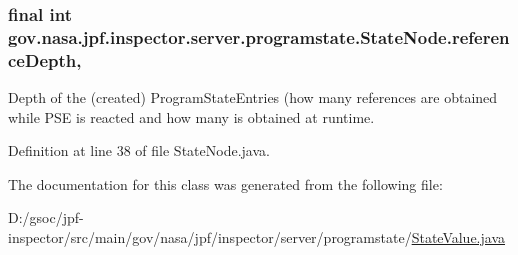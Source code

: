 \subsubsection[{\texorpdfstring{reference\+Depth}{referenceDepth}}]{\setlength{\rightskip}{0pt plus 5cm}final int gov.\+nasa.\+jpf.\+inspector.\+server.\+programstate.\+State\+Node.\+reference\+Depth\hspace{0.3cm}{\ttfamily [protected]}, {\ttfamily [inherited]}}\hypertarget{classgov_1_1nasa_1_1jpf_1_1inspector_1_1server_1_1programstate_1_1_state_node_a55683618625dae46e8aa68d95811d6bb}{}\label{classgov_1_1nasa_1_1jpf_1_1inspector_1_1server_1_1programstate_1_1_state_node_a55683618625dae46e8aa68d95811d6bb}


Depth of the (created) Program\+State\+Entries (how many references are obtained while P\+SE is reacted and how many is obtained at runtime. 



Definition at line 38 of file State\+Node.\+java.



The documentation for this class was generated from the following file\+:\begin{DoxyCompactItemize}
\item 
D\+:/gsoc/jpf-\/inspector/src/main/gov/nasa/jpf/inspector/server/programstate/\hyperlink{_state_value_8java}{State\+Value.\+java}\end{DoxyCompactItemize}
